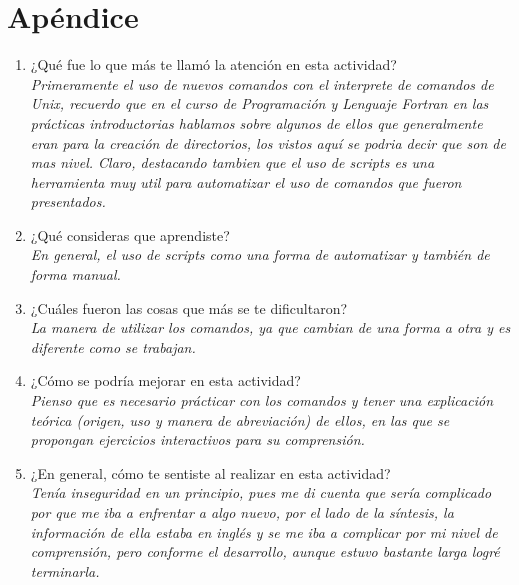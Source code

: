 \documentclass[12pt]{article}
\begin{document}
\section*{Apéndice}
\begin{enumerate}
\item ¿Qué fue lo que más te llamó la atención en esta actividad?\\
\textit{Primeramente el uso de nuevos comandos con el interprete de comandos de Unix, recuerdo que en el curso de Programación y Lenguaje Fortran en las prácticas introductorias hablamos sobre algunos de ellos que generalmente eran para la creación de directorios, los vistos aquí se podria decir que son de mas nivel. Claro, destacando tambien que el uso de scripts es una herramienta muy util para automatizar el uso de comandos que fueron presentados.}
\item ¿Qué consideras que aprendiste?\\
\textit{En general, el uso de scripts como una forma de automatizar y también de forma manual.}
\item ¿Cuáles fueron las cosas que más se te dificultaron?\\
\textit{La manera de utilizar los comandos, ya que cambian de una forma a otra y es diferente como se trabajan.}
\item ¿Cómo se podría mejorar en esta actividad? \\
\textit{Pienso que es necesario prácticar con los comandos y tener una explicación teórica (origen, uso y manera de abreviación) de ellos, en las que se propongan ejercicios interactivos para su comprensión.}
\item ¿En general, cómo te sentiste al realizar en esta actividad?\\
\textit{Tenía inseguridad en un principio, pues me di cuenta que sería complicado por que me iba a enfrentar a algo nuevo, por el lado de la síntesis, la información de ella estaba en inglés y se me iba a complicar por mi nivel de comprensión, pero conforme el desarrollo, aunque estuvo bastante larga logré terminarla.}
\end{enumerate}





\section*{}
\end{document}
